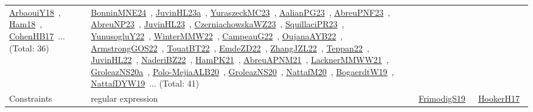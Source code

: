 {\begin{longtable}{lp{3cm}>{\raggedright\arraybackslash}p{6cm}>{\raggedright\arraybackslash}p{6cm}>{\raggedright\arraybackslash}p{8cm}}
\href{../works/ArbaouiY18.pdf}{ArbaouiY18}~\cite{ArbaouiY18}, \href{../works/Ham18.pdf}{Ham18}~\cite{Ham18}, \href{../works/CohenHB17.pdf}{CohenHB17}~\cite{CohenHB17}... (Total: 36) & \href{../works/BonninMNE24.pdf}{BonninMNE24}~\cite{BonninMNE24}, \href{../works/JuvinHL23a.pdf}{JuvinHL23a}~\cite{JuvinHL23a}, \href{../works/YuraszeckMC23.pdf}{YuraszeckMC23}~\cite{YuraszeckMC23}, \href{../works/AalianPG23.pdf}{AalianPG23}~\cite{AalianPG23}, \href{../works/AbreuPNF23.pdf}{AbreuPNF23}~\cite{AbreuPNF23}, \href{../works/AbreuNP23.pdf}{AbreuNP23}~\cite{AbreuNP23}, \href{../works/JuvinHL23.pdf}{JuvinHL23}~\cite{JuvinHL23}, \href{../works/CzerniachowskaWZ23.pdf}{CzerniachowskaWZ23}~\cite{CzerniachowskaWZ23}, \href{../works/SquillaciPR23.pdf}{SquillaciPR23}~\cite{SquillaciPR23}, \href{../works/YunusogluY22.pdf}{YunusogluY22}~\cite{YunusogluY22}, \href{../works/WinterMMW22.pdf}{WinterMMW22}~\cite{WinterMMW22}, \href{../works/CampeauG22.pdf}{CampeauG22}~\cite{CampeauG22}, \href{../works/OujanaAYB22.pdf}{OujanaAYB22}~\cite{OujanaAYB22}, \href{../works/ArmstrongGOS22.pdf}{ArmstrongGOS22}~\cite{ArmstrongGOS22}, \href{../works/TouatBT22.pdf}{TouatBT22}~\cite{TouatBT22}, \href{../works/EmdeZD22.pdf}{EmdeZD22}~\cite{EmdeZD22}, \href{../works/ZhangJZL22.pdf}{ZhangJZL22}~\cite{ZhangJZL22}, \href{../works/Teppan22.pdf}{Teppan22}~\cite{Teppan22}, \href{../works/JuvinHL22.pdf}{JuvinHL22}~\cite{JuvinHL22}, \href{../works/NaderiBZ22.pdf}{NaderiBZ22}~\cite{NaderiBZ22}, \href{../works/HamPK21.pdf}{HamPK21}~\cite{HamPK21}, \href{../works/AbreuAPNM21.pdf}{AbreuAPNM21}~\cite{AbreuAPNM21}, \href{../works/LacknerMMWW21.pdf}{LacknerMMWW21}~\cite{LacknerMMWW21}, \href{../works/GroleazNS20a.pdf}{GroleazNS20a}~\cite{GroleazNS20a}, \href{../works/Polo-MejiaALB20.pdf}{Polo-MejiaALB20}~\cite{Polo-MejiaALB20}, \href{../works/GroleazNS20.pdf}{GroleazNS20}~\cite{GroleazNS20}, \href{../works/NattafM20.pdf}{NattafM20}~\cite{NattafM20}, \href{../works/BogaerdtW19.pdf}{BogaerdtW19}~\cite{BogaerdtW19}, \href{../works/NattafDYW19.pdf}{NattafDYW19}~\cite{NattafDYW19}... (Total: 41)\\
Constraints & regular expression &  & \href{../works/FrimodigS19.pdf}{FrimodigS19}~\cite{FrimodigS19} & \href{../works/HookerH17.pdf}{HookerH17}~\cite{HookerH17}\\

\end{longtable}}
